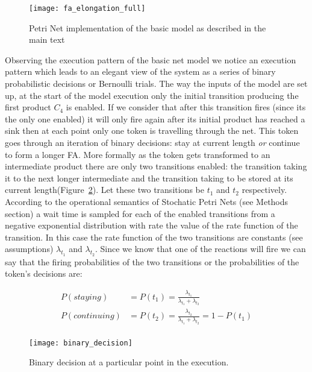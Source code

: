 \begin{figure}[htbp!]
\centering
\texttt{[image: fa\_elongation\_full]}
\caption[Petri Net implementation(basic model)]{Petri Net
  implementation of the basic model as described in the main text}
\label{fig:fa_elongation_full}
\end{figure}


Observing the execution pattern of the basic net model we notice an
execution pattern which leads to an elegant view of the system as a
series of binary probabilistic decisions or Bernoulli trials. The way
the inputs of the model are set up, at the start of the model
execution only the initial transition producing the first product $C_4$ is
enabled. If we consider that after this transition fires (since its
the only one enabled) it
will only fire again after its initial product has reached a sink then
at each point only one token is travelling through the net. This token
goes through an iteration of binary decisions: stay at current length
\textit{or} continue to form a longer
FA. More formally as the token gets
transformed to an intermediate product there are only two transitions
enabled: the transition taking it to the next longer intermediate and
the transition taking to be stored at its current length(Figure~\ref{fig:binary_decision}). Let these
two transitions be $t_1$ and $t_2$ respectively. According to
the operational semantics of Stochatic Petri Nets (see Methods section)
a wait time is sampled for each of the enabled transitions from a
negative exponential distribution with rate the value of the rate
function of the
transition. In this case the rate function of the two transitions are
constants (see assumptions) $\lambda_{t_1}$ and $\lambda_{t_2}$. Since
we know that one of the reactions will fire we can say that the
firing probabilities of the two transitions or the probabilities of
the token's decisions are:

\begin{align*}
P(staying)& =P(t_1) = \frac{\lambda_{t_1}}{\lambda_{t_1} + \lambda_{t_2}}\\
P(continuing) & = P(t_2) = \frac{\lambda_{t_2}}{\lambda_{t_1} + \lambda_{t_2}} = 1 - P(t_1)\\
\end{align*}


\begin{figure}[htbp!]
\centering
\texttt{[image: binary\_decision]}
\caption[Binary stay-continue decision]{Binary decision at a
  particular point in the execution.}
\label{fig:binary_decision}
\end{figure}

